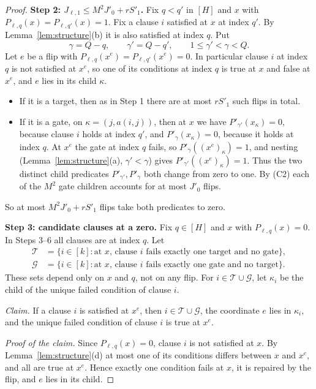 \documentclass[11pt]{article}
\theoremstyle{definition}
\theoremstyle{remark}
\begin{document}
\begin{proof}
\medskip\noindent\textbf{Step 2: \(J_{\ell,1}\le M^2J'_0+rS'_1\).}
Fix \(q<q'\) in \([H]\) and \(x\) with
\(P_{\ell,q}(x)=P_{\ell,q'}(x)=1\). Fix a clause \(i\) satisfied at \(x\) at
index \(q'\). By Lemma~\ref{lem:structure}(b) it is also satisfied at index
\(q\). Put
\[
 \gamma=Q-q,\qquad \gamma'=Q-q',\qquad 1\leq \gamma'<\gamma<Q.
\]
Let \(e\) be a flip with \(P_{\ell,q}(x^e)=P_{\ell,q'}(x^e)=0\). In particular
clause \(i\) at index \(q\) is not satisfied at \(x^e\), so one of its
conditions at index \(q\) is true at \(x\) and false at \(x^e\), and \(e\)
lies in its child \(\kappa\).
\begin{itemize}[leftmargin=2em]
\item If it is a target, then as in Step 1 there are at most \(rS'_1\) such
flips in total.
\item If it is a gate, on \(\kappa=(j,a(i,j))\), then at \(x\) we have
\(P'_{\gamma'}(x_\kappa)=0\), because clause \(i\) holds at index \(q'\), and
\(P'_{\gamma}(x_\kappa)=0\), because it holds at index \(q\). At \(x^e\) the
gate at index \(q\) fails, so \(P'_\gamma((x^e)_\kappa)=1\), and nesting
(Lemma~\ref{lem:structure}(a), \(\gamma'<\gamma\)) gives
\(P'_{\gamma'}((x^e)_\kappa)=1\). Thus the two distinct child predicates
\(P'_{\gamma'},P'_\gamma\) both change from zero to one. By (C2) each of the
\(M^2\) gate children accounts for at most \(J'_0\) flips.
\end{itemize}
So at most \(M^2J'_0+rS'_1\) flips take both predicates to zero.

\medskip\noindent\textbf{Step 3: candidate clauses at a zero.}
Fix \(q\in[H]\) and \(x\) with \(P_{\ell,q}(x)=0\). In Steps 3--6 all clauses
are at index \(q\). Let
\begin{align*}
\mathcal T&=\{i\in[k]:\text{at }x\text{, clause }i\text{ fails exactly one target and no gate}\},\\
\mathcal G&=\{i\in[k]:\text{at }x\text{, clause }i\text{ fails exactly one gate and no target}\}.
\end{align*}
These sets depend only on \(x\) and \(q\), not on any flip. For
\(i\in\mathcal T\cup\mathcal G\), let \(\kappa_i\) be the child of the unique
failed condition of clause \(i\).

\emph{Claim.} If a clause \(i\) is satisfied at \(x^e\), then
\(i\in\mathcal T\cup\mathcal G\), the coordinate \(e\) lies in \(\kappa_i\),
and the unique failed condition of clause \(i\) is true at \(x^e\).

\emph{Proof of the claim.} Since \(P_{\ell,q}(x)=0\), clause \(i\) is not
satisfied at \(x\). By Lemma~\ref{lem:structure}(d) at most one of its
conditions differs between \(x\) and \(x^e\), and all are true at \(x^e\).
Hence exactly one condition fails at \(x\), it is repaired by the flip, and
\(e\) lies in its child.


\end{proof}
\end{document}
